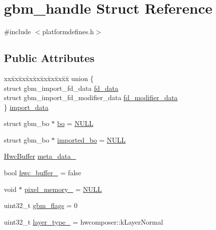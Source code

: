 \hypertarget{structgbm__handle}{}\section{gbm\+\_\+handle Struct Reference}
\label{structgbm__handle}


{\ttfamily \#include $<$platformdefines.\+h$>$}

\subsection*{Public Attributes}
\begin{DoxyCompactItemize}
\item 
\begin{tabbing}
xx\=xx\=xx\=xx\=xx\=xx\=xx\=xx\=xx\=\kill
union \{\\
\>struct gbm\_import\_fd\_data \mbox{\hyperlink{structgbm__handle_ae11f3776ec272cc4b10ec0625b647170}{fd\_data}}\\
\>struct gbm\_import\_fd\_modifier\_data \mbox{\hyperlink{structgbm__handle_af706ddaa68480c1cf930a67d6698c1d6}{fd\_modifier\_data}}\\
\} \mbox{\hyperlink{structgbm__handle_ac2450148a271a449b35ff12966de8518}{import\_data}}\\

\end{tabbing}\item 
struct gbm\+\_\+bo $\ast$ \mbox{\hyperlink{structgbm__handle_a9010ca6ee25cee546643f6d6c5b6c4cf}{bo}} = \mbox{\hyperlink{alios_2platformdefines_8h_a070d2ce7b6bb7e5c05602aa8c308d0c4}{N\+U\+LL}}
\item 
struct gbm\+\_\+bo $\ast$ \mbox{\hyperlink{structgbm__handle_a4b2a575f5ac73f3979610fae70b44ffd}{imported\+\_\+bo}} = \mbox{\hyperlink{alios_2platformdefines_8h_a070d2ce7b6bb7e5c05602aa8c308d0c4}{N\+U\+LL}}
\item 
\mbox{\hyperlink{structHwcBuffer}{Hwc\+Buffer}} \mbox{\hyperlink{structgbm__handle_a2d3bce2c387abbf976b37d52b272ebbe}{meta\+\_\+data\+\_\+}}
\item 
bool \mbox{\hyperlink{structgbm__handle_aa98e98315d3cd7596b980b80e1199649}{hwc\+\_\+buffer\+\_\+}} = false
\item 
void $\ast$ \mbox{\hyperlink{structgbm__handle_ade4ce7c6a2df0e1e351af03309098005}{pixel\+\_\+memory\+\_\+}} = \mbox{\hyperlink{alios_2platformdefines_8h_a070d2ce7b6bb7e5c05602aa8c308d0c4}{N\+U\+LL}}
\item 
uint32\+\_\+t \mbox{\hyperlink{structgbm__handle_a5deee85dd01fe245644d1971dcdd1f89}{gbm\+\_\+flags}} = 0
\item 
uint32\+\_\+t \mbox{\hyperlink{structgbm__handle_aeaaf0fd4477abfe406de45109d6af33c}{layer\+\_\+type\+\_\+}} = hwcomposer\+::k\+Layer\+Normal
\end{DoxyCompactItemize}


